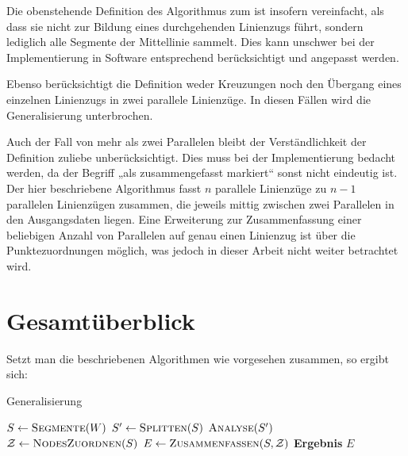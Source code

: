 \documentclass[../main/thesis.tex]{subfiles}
\begin{document}
Die obenstehende Definition des Algorithmus zum  ist insofern vereinfacht, als dass sie nicht zur Bildung eines durchgehenden Linienzugs führt, sondern lediglich alle Segmente der Mittellinie sammelt.
Dies kann unschwer bei der Implementierung in Software entsprechend berücksichtigt und angepasst werden.

Ebenso berücksichtigt die Definition weder Kreuzungen noch den Übergang eines einzelnen Linienzugs in zwei parallele Linienzüge.
In diesen Fällen wird die Generalisierung unterbrochen.

Auch der Fall von mehr als zwei Parallelen bleibt der Verständlichkeit der Definition zuliebe unberücksichtigt.
Dies muss bei der Implementierung bedacht werden, da der Begriff „als zusammengefasst markiert“ sonst nicht eindeutig ist.
Der hier beschriebene Algorithmus fasst $n$ parallele Linienzüge zu $n-1$ parallelen Linienzügen zusammen, die jeweils mittig zwischen zwei Parallelen in den Ausgangsdaten liegen.
Eine Erweiterung zur Zusammenfassung einer beliebigen Anzahl von Parallelen auf genau einen Linienzug ist über die Punktezuordnungen möglich, was jedoch in dieser Arbeit nicht weiter betrachtet wird.




\section{Gesamtüberblick}
\label{ch:algorithm-overview}

Setzt man die beschriebenen Algorithmen wie vorgesehen zusammen, so ergibt sich: \nopagebreak

\begin{algorithmhere}{Generalisierung}
\label{alg:Generalisierung}
\begin{algorithmic}
	\State $S \gets \textproc{Segmente}(W)$
	\State $S' \gets \textproc{Splitten}(S)$
	\State $\textproc{Analyse}(S')$
	\State $\mathcal{Z} \gets \textproc{NodesZuordnen}(S)$
	\State $E \gets \textproc{Zusammenfassen}(S, \mathcal{Z})$
	\State \textbf{Ergebnis} $E$
\EndFunction
\end{algorithmic}
\end{algorithmhere}
\end{document}
